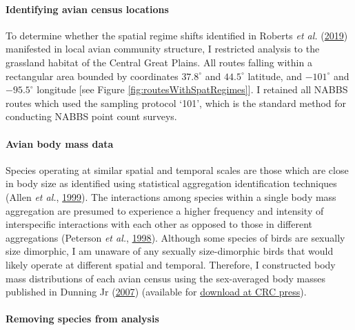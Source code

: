 \documentclass[print]{nuthesis}
\begin{document}
\hypertarget{identifying-avian-census-locations}{%
\paragraph{Identifying avian census locations}\label{identifying-avian-census-locations}}

To determine whether the spatial regime shifts identified in Roberts \emph{et al.} (\protect\hyperlink{ref-roberts2019shifting}{2019}) manifested in local avian community structure, I restricted analysis to the grassland habitat of the Central Great Plains. All routes falling within a rectangular area bounded by coordinates \(37.8^\circ\) and \(44.5^\circ\) latitude, and \(-101^\circ\) and \(-95.5^\circ\) longitude {[}see Figure \ref{fig:routesWithSpatRegimes}{]}. I retained all NABBS routes which used the sampling protocol `101', which is the standard method for conducting NABBS point count surveys.

\hypertarget{avian-body-mass-data}{%
\paragraph{Avian body mass data}\label{avian-body-mass-data}}

Species operating at similar spatial and temporal scales are those which are close in body size as identified using statistical aggregation identification techniques (Allen \emph{et al.}, \protect\hyperlink{ref-allen1999body}{1999}). The interactions among species within a single body mass aggregation are presumed to experience a higher frequency and intensity of interspecific interactions with each other as opposed to those in different aggregations (Peterson \emph{et al.}, \protect\hyperlink{ref-peterson1998ecological}{1998}). Although some species of birds are sexually size dimorphic, I am unaware of any sexually size-dimorphic birds that would likely operate at different spatial and temporal. Therefore, I constructed body mass distributions of each avian census using the sex-averaged body masses published in Dunning Jr (\protect\hyperlink{ref-dunning2007crc}{2007}) (available for \href{https://www.crcpress.com/CRC-Handbook-of-Avian-Body-Masses/Dunning-Jr/p/book/9781420064445}{download at CRC press}).

\hypertarget{removing-species-from-analysis}{%
\paragraph{Removing species from analysis}\label{removing-species-from-analysis}}
\end{document}
